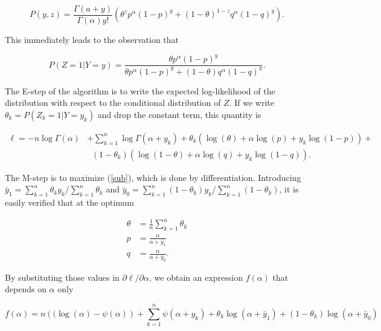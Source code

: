 \documentclass[12pt]{article}
\begin{document}
\begin{appendices}
    \begin{equation*}
    P(y, z) = \frac{\Gamma(a+y)}{\Gamma(\alpha)y!}
      \left(\theta^z p^{\alpha}(1-p)^y + (1-\theta)^{1-z}
      q^{\alpha}(1-q)^y\right).
    \end{equation*}

    This immediately leads to the observation that

    \begin{equation}
    P(Z=1 | Y=y) = \frac{\theta p^{\alpha}(1-p)^y}
      {\theta p^{\alpha}(1-p)^y + (1-\theta) q^{\alpha}(1-q)^y}.
    \end{equation}

    The E-step of the algorithm is to write the expected log-likelihood
    of the distribution with respect to the conditional distribution
    of $Z$. If we write $\theta_k = P(Z_k=1 | Y=y_k)$ and drop the
    constant term, this quantity is

    \begin{align}
    \ell = -n \log \Gamma(\alpha) &+ \sum_{k=1}^n
      \log \Gamma(\alpha + y_k) + \nonumber
    \theta_k (\log(\theta) + \alpha \log(p) +
    y_k \log(1-p)) + \nonumber \\
    &\;\; (1-\theta_k) (\log(1-\theta) + \alpha \log(q) +
    y_k \log(1-q)).
\label{sub}
    \end{align}

    The M-step is to maximize (\ref{sub}), which is done by
    differentiation. Introducing
    $\bar{y}_1 = \sum_{k=1}^n \theta_k y_k / \sum_{k=1}^n \theta_k$
    and $\bar{y}_0 = \sum_{k=1}^n (1-\theta_k) y_k /
    \sum_{k=1}^n (1-\theta_k)$, it is easily verified that at
    the optimum

    \begin{align*}
    \theta &= \frac{1}{n}\sum_{k=1}^n\theta_k \\
    p &= \frac{\alpha} {\alpha+\bar{y}_1} \\
    q &= \frac{\alpha} {\alpha+\bar{y}_0}.
    \end{align*}

    By substituting those values in $\partial \ell / \partial \alpha$,
    we obtain an expression $f(\alpha)$ that depends on $\alpha$ only

    \begin{equation*}
       f(\alpha) = n \left( (\log(\alpha) - \psi(\alpha) \right) +
      \sum_{k=1}^n \psi(\alpha+y_k) + \theta_k \log(\alpha + \bar{y}_1)
      + (1-\theta_k) \log(\alpha + \bar{y}_0)
    \end{equation*}


\end{appendices}
\end{document}
